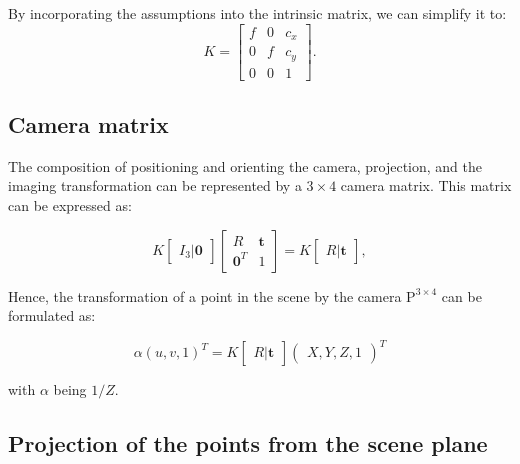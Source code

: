 By incorporating the assumptions  into the intrinsic matrix,
we can simplify it to:
\begin{equation}
	K = \begin{bmatrix}
		f & 0 & c_x \\
		0 & f & c_y \\
		0 & 0 & 1
	\end{bmatrix}.
\end{equation}

\subsection{Camera matrix}\label{sub:camera_matrix}

The composition of positioning and orienting the camera, projection, and the
imaging transformation can be represented by a $3 \times 4$ camera
matrix. This matrix can be expressed as:

\begin{equation}
	K \begin{bmatrix}
		I_3 \vert \mathbf{0}
	\end{bmatrix} \begin{bmatrix}
		R              & \mathbf{t} \\
		\mathbf{0}^{T} & 1
	\end{bmatrix} = K \begin{bmatrix}
		R \vert \mathbf{t}
	\end{bmatrix},
\end{equation}

Hence, the transformation of a point in the scene by the camera $\mathrm{P}^{3 \times 4}$ can be formulated as:

\begin{equation}
	\alpha(u, v, 1)^{T} = K \begin{bmatrix}
		R \vert \mathbf{t}
	\end{bmatrix} \begin{pmatrix}
		X, Y, Z, 1
	\end{pmatrix}^{T}
\end{equation}

with $\alpha$ being $1 / Z$.

\subsection{Projection of the points from the scene plane}\label{sub:projection_of_the_points_from_the_scene_plane}

